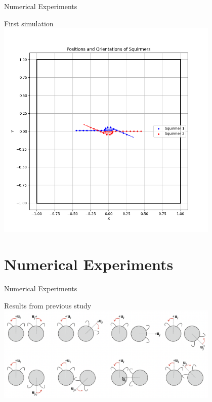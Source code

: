 \documentclass{beamer}
\begin{document}
\begin{frame}{Numerical Experiments}
    \begin{center}
        First simulation
        \includegraphics[width=0.8\textwidth]{../../graphs/squirmers_colliding.png}
    \end{center}
\end{frame}

\section{Numerical Experiments}
\begin{frame}{Numerical Experiments}
    \begin{center}
        Results from previous study \cite{Stark}
        \includegraphics[width=0.8\textwidth]{../images/stark_behavior.png}
        \cite{Stark}
    \end{center}
\end{frame}

\end{document}
